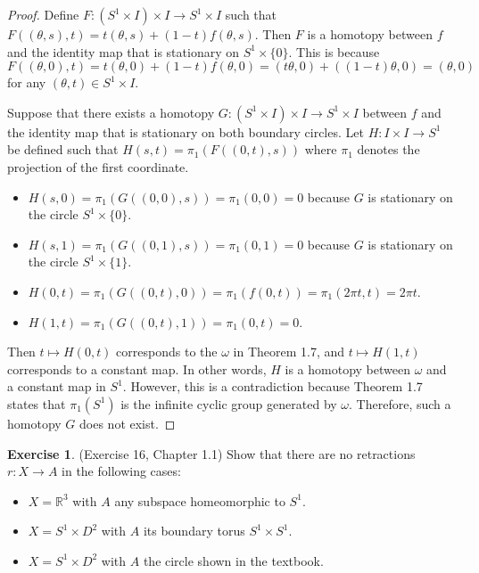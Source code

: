 \documentclass[12pt, psamsfonts]{amsart}
\theoremstyle{definition}
\newtheorem{exer}[thm]{Exercise}
\theoremstyle{remark}
\numberwithin{equation}{section}
\begin{document}
\begin{proof}
  Define $F: (S^1 \times I) \times I \rightarrow S^1 \times I$ such that $F((\theta, s), t) = t(\theta, s) + (1 - t)f(\theta, s)$.
  Then $F$ is a homotopy between $f$ and the identity map that is stationary on $S^1 \times \{ 0 \}$.
  This is because $F((\theta, 0), t) = t(\theta, 0) + (1 - t)f(\theta, 0) = (t\theta, 0) + ((1 - t)\theta, 0) = (\theta, 0)$ for any $(\theta, t) \in S^1 \times I$.

  Suppose that there exists a homotopy $G: (S^1 \times I) \times I \rightarrow S^1 \times I$ between $f$ and the identity map that is stationary on both boundary circles.
  Let $H: I \times I \rightarrow S^1$ be defined such that $H(s, t) = \pi_1(F((0, t), s))$ where $\pi_1$ denotes the projection of the first coordinate.

  \begin{itemize}
    \item
      $H(s, 0) = \pi_1(G((0, 0), s)) = \pi_1(0, 0) = 0$ because $G$ is stationary on the circle $S^1 \times \{ 0 \}$.
    \item
      $H(s, 1) = \pi_1(G((0, 1), s)) = \pi_1(0, 1) = 0$ because $G$ is stationary on the circle $S^1 \times \{ 1 \}$.
    \item
      $H(0, t) = \pi_1(G((0, t), 0)) = \pi_1(f(0, t)) = \pi_1(2\pi t, t) = 2\pi t$.
    \item
      $H(1, t) = \pi_1(G((0, t), 1)) = \pi_1(0, t) = 0$.
  \end{itemize}

  Then $t \mapsto H(0, t)$ corresponds to the $\omega$ in Theorem 1.7, and $t \mapsto H(1, t)$ corresponds to a constant map.
  In other words, $H$ is a homotopy between $\omega$ and a constant map in $S^1$.
  However, this is a contradiction because Theorem 1.7 states that $\pi_1(S^1)$ is the infinite cyclic group generated by $\omega$.
  Therefore, such a homotopy $G$ does not exist.
\end{proof}

\begin{exer}{(Exercise 16, Chapter 1.1)}
  Show that there are no retractions $r: X \rightarrow A$ in the following cases:
  \begin{itemize}
    \item
      $X = \mathbb{R}^3$ with $A$ any subspace homeomorphic to $S^1$.
    \item
      $X = S^1 \times D^2$ with $A$ its boundary torus $S^1 \times S^1$.
    \item
      $X = S^1 \times D^2$ with $A$ the circle shown in the textbook.
  \end{itemize}
\end{exer}
\end{document}
